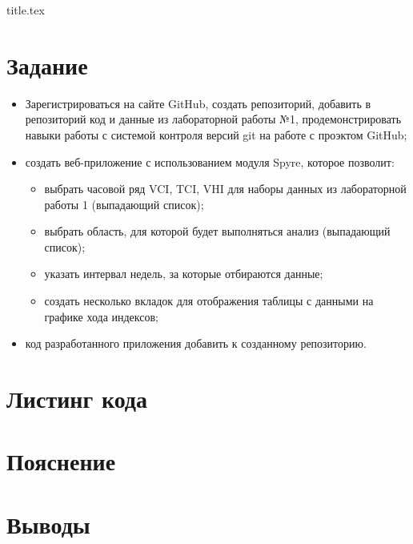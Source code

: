 




{title.tex}

\clearpage



\clearpage
{}
\pagestyle{fancy}
\setcounter{page}{2}

\clearpage

\chapter{Задание}
\begin{itemize}
\item Зарегистрироваться на сайте GitHub, создать репозиторий, добавить в репозиторий код и данные из лабораторной работы №1, продемонстрировать навыки работы с системой контроля версий git на работе с проэктом GitHub;
\item создать веб-приложение с использованием модуля Spyre, которое позволит:
\begin{itemize}
\item выбрать часовой ряд VCI, TCI, VHI для наборы данных из лабораторной работы 1 (выпадающий список);
\item выбрать область, для которой будет выполняться анализ (выпадающий список);
\item указать интервал недель, за которые отбираются данные;
\item создать несколько вкладок для отображения таблицы с данными на графике хода индексов;
\end{itemize}
\item код разработанного приложения добавить к созданному репозиторию.
\end{itemize}

\chapter{Листинг кода}
\lstset{inputencoding=utf8, extendedchars=\true}


\chapter{Пояснение}


\chapter*{Выводы}





